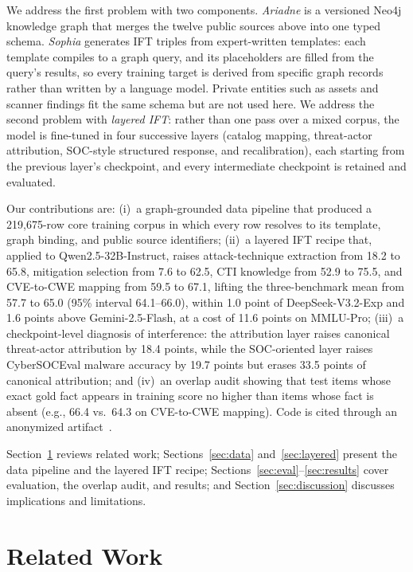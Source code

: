 \documentclass[conference]{IEEEtran}
\begin{document}
We address the first problem with two components. \emph{Ariadne} is a versioned Neo4j knowledge graph that merges the twelve public sources above into one typed schema. \emph{Sophia} generates IFT triples from expert-written templates: each template compiles to a graph query, and its placeholders are filled from the query's results, so every training target is derived from specific graph records rather than written by a language model. Private entities such as assets and scanner findings fit the same schema but are not used here. We address the second problem with \emph{layered IFT}: rather than one pass over a mixed corpus, the model is fine-tuned in four successive layers (catalog mapping, threat-actor attribution, SOC-style structured response, and recalibration), each starting from the previous layer's checkpoint, and every intermediate checkpoint is retained and evaluated.

Our contributions are: (i)~a graph-grounded data pipeline that produced a 219,675-row core training corpus in which every row resolves to its template, graph binding, and public source identifiers; (ii)~a layered IFT recipe that, applied to Qwen2.5-32B-Instruct, raises attack-technique extraction from 18.2 to 65.8, mitigation selection from 7.6 to 62.5, CTI knowledge from 52.9 to 75.5, and CVE-to-CWE mapping from 59.5 to 67.1, lifting the three-benchmark mean from 57.7 to 65.0 (95\% interval 64.1--66.0), within 1.0 point of DeepSeek-V3.2-Exp and 1.6 points above Gemini-2.5-Flash, at a cost of 11.6 points on MMLU-Pro; (iii)~a checkpoint-level diagnosis of interference: the attribution layer raises canonical threat-actor attribution by 18.4 points, while the SOC-oriented layer raises CyberSOCEval malware accuracy by 19.7 points but erases 33.5 points of canonical attribution; and (iv)~an overlap audit showing that test items whose exact gold fact appears in training score no higher than items whose fact is absent (e.g., 66.4 vs.\ 64.3 on CVE-to-CWE mapping). Code is cited through an anonymized artifact~\cite{anonartifact}.

Section~\ref{sec:related} reviews related work; Sections~\ref{sec:data} and~\ref{sec:layered} present the data pipeline and the layered IFT recipe; Sections~\ref{sec:eval}--\ref{sec:results} cover evaluation, the overlap audit, and results; and Section~\ref{sec:discussion} discusses implications and limitations.

\section{Related Work}\label{sec:related}
\end{document}
